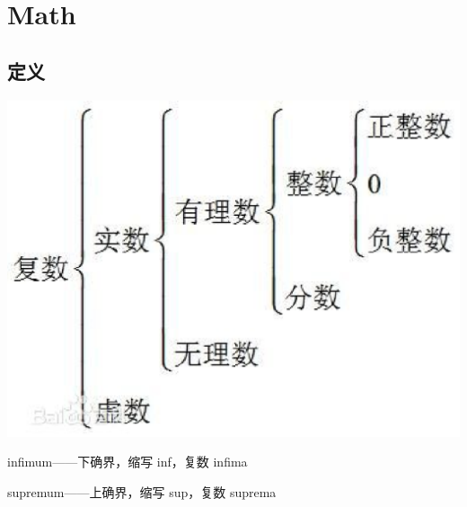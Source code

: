 \chapter{Math}

\section{定义}
\includegraphics[scale=0.4]{fig/numbers.eps}
\cite{_infimum_????}\par
infimum——下确界，缩写 inf，复数 infima \par
supremum——上确界，缩写 sup，复数 suprema

